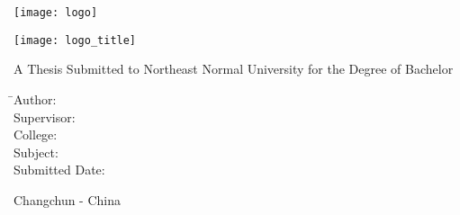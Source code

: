 
\thispagestyle{empty}

\vspace{5mm}

\begin{center}
   \texttt{[image: logo]}
\end{center}

\vspace{2mm}

\begin{center}
  \texttt{[image: logo\_title]}
\end{center}

\vspace{20mm}

\begin{center}
    \sanhao A Thesis Submitted to Northeast Normal University for the Degree of Bachelor
\end{center}

\vspace{20mm}

\centerline{\sanhao \textbf{\nstitlee}}

\vspace{7mm}

\begin{tabbing}
    \hspace{18mm} 
                  \= \sihao Author:\hspace{19mm} \= \underline{\makebox[8cm]{\sihao\nsauthornamee\hspace{3mm}\nsauthorid}} \\[2mm]
                  \> \sihao Supervisor: \> \underline{\makebox[8cm]{\sihao\nsmentore}} \\[2mm]
                  \> \sihao College: \> \underline{\makebox[8cm]{\sihao\nscollegee}} \\[2mm]
                  \> \sihao Subject: \> \underline{\makebox[8cm]{\sihao\nssubject}} \\[2mm]
                  \> \sihao Submitted Date: \> \underline{\makebox[8cm]{\sihao\nssubmitteddatee}}
\end{tabbing}

\vspace{20mm}

\centerline{Changchun - China}

\clearpage
